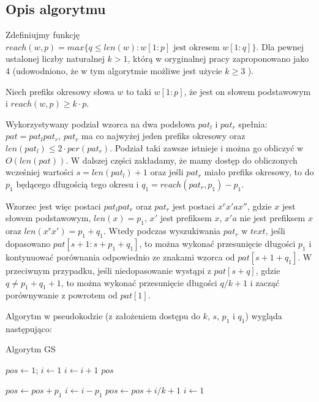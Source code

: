 \subsection{Opis algorytmu}
Zdefiniujmy funkcję $reach(w,p) = max\{q \leq len(w) \colon w[1:p] \text{ jest okresem } w[1:q]\}$. Dla pewnej ustalonej liczby naturalnej $k>1$, którą w oryginalnej pracy zaproponowano jako 4 (udowodniono, że w tym algorytmie możliwe jest użycie $k \geq 3$ \cite{GS-CR}).

\begin{definition}
Niech prefiks okresowy słowa $w$ to taki $w[1:p]$, że jest on słowem podstawowym i $reach(w,p) \geq k \cdot p$.
\end{definition}

Wykorzystywany podział wzorca na dwa podsłowa $pat_{l}$ i $pat_{r}$ spełnia: $pat = pat_{l}pat_{r}$, $pat_{r}$ ma co najwyżej jeden prefiks okresowy oraz $len(pat_{l}) \leq 2 \cdot per(pat_{r})$. Podział taki zawsze istnieje i można go obliczyć w $O(len(pat))$. W dalszej części zakładamy, że mamy dostęp do obliczonych wcześniej wartości $s=len(pat_{l})+1$ oraz jeśli $pat_{r}$ miało prefiks okresowy, to do $p_{1}$ będącego długością tego okresu i $q_{1}=reach(pat_{r}, p_{1})-p_{1}$. 

Wzorzec jest więc postaci $pat_{l}pat_{r}$ oraz $pat_{r}$ jest postaci $x^{r}x'ax''$, gdzie $x$ jest słowem podstawowym, $len(x)=p_{1}$, $x'$ jest prefiksem $x$, $x'a$ nie jest prefiksem $x$ oraz $len(x^{r}x')=p_{1}+q_{1}$. Wtedy podczas wyszukiwania $pat_{r}$ w $text$, jeśli dopasowano $pat[s+1:s+p_{1}+q_{1}]$, to można wykonać przesunięcie długości $p_{1}$ i kontynuować porównania odpowiednio ze znakami wzorca od $pat[s+1+q_{1}]$. W przeciwnym przypadku, jeśli niedopasowanie wystąpi z $pat[s+q]$, gdzie $q \neq p_{1}+q_{1}+1$, to można wykonać przesunięcie długości $q/k+1$ i zacząć porównywanie z powrotem od $pat[1]$.

\newpage
\noindent
Algorytm w pseudokodzie (z założeniem dostępu do $k$, $s$, $p_{1}$ i $q_{1}$) wygląda następująco:
\begin{algorithm}
\caption{Algorytm GS}\label{alg:gs}
\begin{algorithmic}[1]
\State $pos \gets 1$; $i \gets 1$
        \State $i \gets i + 1$
    \EndWhile
        \State \Return $pos$
    \EndIf

        \State $pos \gets pos + p_{1}$
        \State $i \gets i - p_{1}$
    \Else
        \State $pos \gets pos + i/k + 1$
        \State $i \gets 1$
    \EndIf
\EndWhile
\end{algorithmic}
\end{algorithm}

